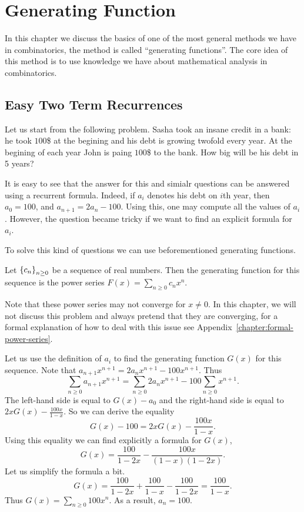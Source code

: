 \chapter{Generating Function}
\label{chapter:generating-functions}
In this chapter we discuss the basics of one of the most general methods we have
in combinatorics, the method is called ``generating functions''. The core idea
of this method is to use knowledge we have about mathematical analysis in
combinatorics.

\section{Easy Two Term Recurrences}
Let us start from the following problem.
Sasha took an insane credit in a bank: he took $100$\$ at the begining and
his debt is growing twofold every year. At the begining of each year John is
paing $100$\$ to the bank. How big will be his debt in 5 years?

It is easy to see that the answer for this and simialr questions can be answered
using a recurrent formula. Indeed, if $a_i$ denotes his debt on $i$th year,
then $a_0 = 100$, and $a_{n + 1} = 2 a_n - 100$. Using this, one may compute
all the values of $a_i$. However, the question became tricky if we want to
find an explicit formula for $a_i$.

To solve this kind of questions we can use beforementioned generating functions.
\begin{definition}
  Let $\set{c_n}_{n \ge 0}$ be a sequence of real numbers. Then
  the generating function for this sequence is the power series
  $F(x) = \sum_{n \ge 0} c_n x^n$.
\end{definition}
Note that these power series may not converge for $x \neq 0$.
In this chapter, we will not discuss this problem and always pretend that
they are converging, for a formal explanation of how to deal with this issue see
Appendix~\ref{chapter:formal-power-series}.

Let us use the definition of $a_i$ to find the generating function $G(x)$
for this sequence. Note that
$a_{n + 1} x^{n + 1} = 2 a_n x^{n + 1} - 100 x^{n + 1}$. Thus
\[
  \sum_{n \ge 0} a_{n + 1} x^{n + 1} =
    \sum_{n \ge 0} 2 a_n x^{n + 1} - 100 \sum_{n \ge 0} x^{n + 1}.
\]
The left-hand side is equal to $G(x) - a_0$ and the right-hand side is
equal to $2xG(x) - \frac{100 x}{1 - x}$. So we can derive the equality
\[
  G(x) - 100 = 2xG(x) - \frac{100 x}{1 - x}.
\]
Using this equality we can find explicitly a formula for $G(x)$,
\[
  G(x) = \frac{100}{1 - 2x} - \frac{100x}{(1 - x)(1 - 2x)}.
\]
Let us simplify the formula a bit.
\[
  G(x) = \frac{100}{1 - 2x} + \frac{100}{1 - x} - \frac{100}{1 - 2x} =
  \frac{100}{1 - x}.
\]
Thus $G(x) = \sum_{n \ge 0} 100 x^n$. As a result, $a_n = 100$.

